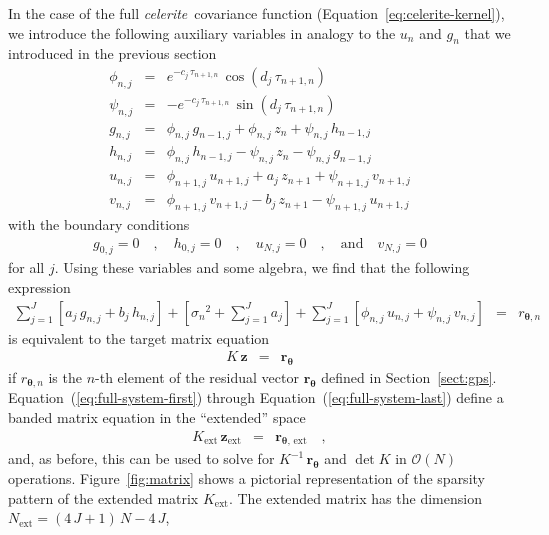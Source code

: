 \documentclass[manuscript, letterpaper]{aastex6}
\newcommand{\celeriteterm}{\emph{celerite}}
\newcommand{\figureref}[1]{\ref{fig:#1}}
\newcommand{\Figure}[1]{Figure~\figureref{#1}}
\renewcommand{\eqref}[1]{\ref{eq:#1}}
\newcommand{\Eq}[1]{Equation~(\eqref{#1})}
\newcommand{\eq}[1]{\Eq{#1}}
\newcommand{\eqalt}[1]{Equation~\eqref{#1}}
\newcommand{\eqlabel}[1]{\label{eq:#1}}
\newcommand{\sectionname}{Section}
\newcommand{\sectref}[1]{\ref{sect:#1}}
\newcommand{\Sect}[1]{\sectionname~\sectref{#1}}
\newcommand{\sect}[1]{\Sect{#1}}
\newcommand{\bvec}[1]{{\ensuremath{\boldsymbol{#1}}}}
\begin{document}
In the case of the full \celeriteterm\ covariance function
(\eqalt{celerite-kernel}), we introduce the following auxiliary variables in
analogy to the $u_n$ and $g_n$ that we introduced in the previous section
\begin{eqnarray}\eqlabel{full-system-first}
\phi_{n,j} &=& e^{-c_j\,\tau_{n+1,n}}\,\cos\left(d_j\,\tau_{n+1,n}\right)\\
\psi_{n,j} &=& -e^{-c_j\,\tau_{n+1,n}}\,\sin\left(d_j\,\tau_{n+1,n}\right)\\
g_{n,j} &=& \phi_{n,j}\,g_{n-1,j} + \phi_{n,j}\,z_n + \psi_{n,j}\,h_{n-1,j}\\
h_{n,j} &=& \phi_{n,j}\,h_{n-1,j} - \psi_{n,j}\,z_n - \psi_{n,j}\,g_{n-1,j}\\
u_{n,j} &=& \phi_{n+1,j}\,u_{n+1,j} + a_j\,z_{n+1} + \psi_{n+1,j}\,v_{n+1,j}\\
v_{n,j} &=& \phi_{n+1,j}\,v_{n+1,j} - b_j\,z_{n+1} - \psi_{n+1,j}\,u_{n+1,j}
\end{eqnarray}
with the boundary conditions
\begin{eqnarray}
    g_{0,j} = 0 \quad, \quad
    h_{0,j} = 0 \quad, \quad
    u_{N,j} = 0 \quad, \quad\mathrm{and}\quad
    v_{N,j} = 0
\end{eqnarray}
for all $j$.
Using these variables and some algebra, we find that the following expression
\begin{eqnarray}\eqlabel{full-system-last}
\sum_{j=1}^J \left[a_j\,g_{n,j}+b_j\,h_{n,j}\right]
+ \left[{\sigma_n}^2+\sum_{j=1}^J a_j\right]
+ \sum_{j=1}^J \left[\phi_{n,j}\,u_{n,j}+\psi_{n,j}\,v_{n,j}\right]
    &=& r_{\bvec{\theta},n}
\end{eqnarray}
is equivalent to the target matrix equation
\begin{eqnarray}
K\,\bvec{z} &=& \bvec{r}_\bvec{\theta}
\end{eqnarray}
if $r_{\bvec{\theta},n}$ is the $n$-th element of the residual vector
$\bvec{r}_\bvec{\theta}$ defined in \sect{gps}.
\eq{full-system-first} through \eq{full-system-last} define a banded matrix
equation in the ``extended'' space
\begin{eqnarray}\eqlabel{kext-full}
    K_\mathrm{ext}\,\bvec{z}_\mathrm{ext} &=&
    \bvec{r}_{\bvec{\theta},\,\mathrm{ext}} \quad,
\end{eqnarray}
and, as before, this can be used to solve
for $K^{-1}\,\bvec{r}_\bvec{\theta}$ and $\det K$ in $\mathcal{O}(N)$
operations.
\Figure{matrix} shows a pictorial representation of the sparsity pattern of
the extended matrix $K_\mathrm{ext}$.
The extended matrix has the dimension $N_\mathrm{ext} = (4\,J+1)\,N-4\,J$,
\end{document}
